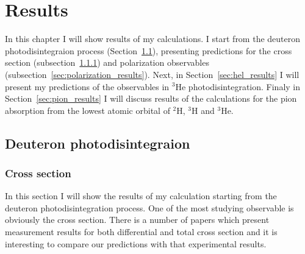 \chapter{Results}\label{chap:results}

    In this chapter I will show results of my calculations. I start from the deuteron photodisintegraion process
    (Section~\ref{sec:de_results}),
    presenting predictions for the cross section (subsection~\ref{sec:cross_results}) 
    and polarization observables  (subsection~\ref{sec:polarization_results}).
    Next, in 
    Section~\ref{sec:hel_results} I will present my predictions of the observables
    in $^3$He photodisintegration.
    Finaly in Section~\ref{sec:pion_results} I will discuss results of the calculations
    for the pion absorption from the lowest atomic orbital of $^2$H, $^3$H and $^3$He.

\section{Deuteron photodisintegraion}
\label{sec:de_results}
    \subsection{Cross section}
    \label{sec:cross_results}

    In this section I will show the results of my calculation starting from the
    deuteron photodisintegration process. One of the most
    studying observable is obviously the cross section. There is
    a number of papers which present 
    measurement results for both differential and total cross section
    \cite{BOSMAN1979,ARENDS1984,Skopik1974, Moreh1989, Birenbaum1985, Bernabei1986, rachek2007,Ying_Experiment_Deut, DeSanctis_Experiment_Deut} 
    and it is interesting to compare 
    our predictions with that experimental results.

